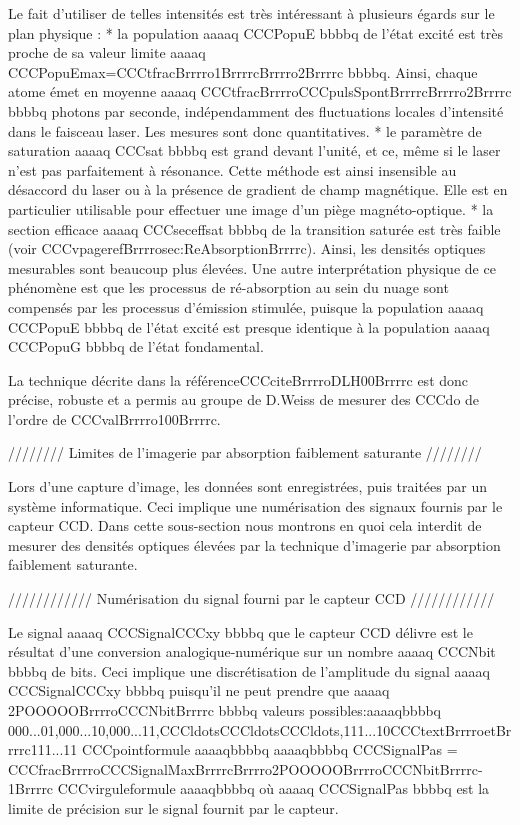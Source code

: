 Le fait d'utiliser de telles intensités est très intéressant à plusieurs égards sur le plan physique :
	* la population aaaaq CCCPopuE bbbbq de l'état excité est très proche	 
	de sa valeur limite aaaaq CCCPopuEmax=CCCtfracBrrrro1BrrrrcBrrrro2Brrrrc bbbbq. Ainsi, chaque atome émet en moyenne aaaaq CCCtfracBrrrroCCCpulsSpontBrrrrcBrrrro2Brrrrc bbbbq photons par seconde, indépendamment des fluctuations locales d'intensité dans le faisceau laser. Les mesures sont donc quantitatives.
	* le paramètre de saturation aaaaq CCCsat bbbbq est grand devant l'unité, et ce, même si le laser n'est pas parfaitement à résonance. Cette méthode est ainsi insensible au désaccord du laser ou à la présence de gradient de champ magnétique. Elle est en particulier utilisable pour effectuer une image d'un piège magnéto-optique.
	* la section efficace aaaaq CCCseceffsat bbbbq de la transition saturée est très faible (voir CCCvpagerefBrrrrosec:ReAbsorptionBrrrrc). Ainsi, les densités optiques mesurables sont beaucoup plus élevées. Une autre interprétation physique de ce phénomène est que les processus de ré-absorption au sein du nuage sont compensés par les processus d'émission stimulée, puisque la population aaaaq CCCPopuE bbbbq de l'état excité est presque identique à la population aaaaq CCCPopuG bbbbq de l'état fondamental.

La technique décrite dans la référenceCCCciteBrrrroDLH00Brrrrc est donc précise, robuste et a permis au groupe de D.Weiss de mesurer des CCCdo de l'ordre de CCCvalBrrrro100Brrrrc.


//////// Limites de l'imagerie par absorption faiblement saturante ////////

Lors d'une capture d'image, les données sont enregistrées, puis traitées par un système informatique. Ceci implique une numérisation des signaux fournis par le capteur CCD. 
Dans cette sous-section nous montrons en quoi cela interdit de mesurer des densités optiques élevées par la technique d'imagerie par absorption faiblement saturante. 


//////////// Numérisation du signal fourni par le capteur CCD ////////////

	Le signal aaaaq CCCSignalCCCxy bbbbq que le capteur CCD délivre est le résultat d'une conversion analogique-numérique sur un nombre aaaaq CCCNbit bbbbq de bits. Ceci implique une discrétisation de l'amplitude du signal aaaaq CCCSignalCCCxy bbbbq puisqu'il ne peut prendre que aaaaq 2POOOOOBrrrroCCCNbitBrrrrc bbbbq valeurs possibles:aaaaqbbbbq
000...01,000...10,000...11,CCCldotsCCCldotsCCCldots,111...10CCCtextBrrrroetBrrrrc111...11
CCCpointformule
aaaaqbbbbq 
	aaaaqbbbbq
	CCCSignalPas = CCCfracBrrrroCCCSignalMaxBrrrrcBrrrro2POOOOOBrrrroCCCNbitBrrrrc-1Brrrrc 	CCCvirguleformule
	aaaaqbbbbq
où aaaaq CCCSignalPas bbbbq est la limite de précision sur le signal fournit par le capteur.


